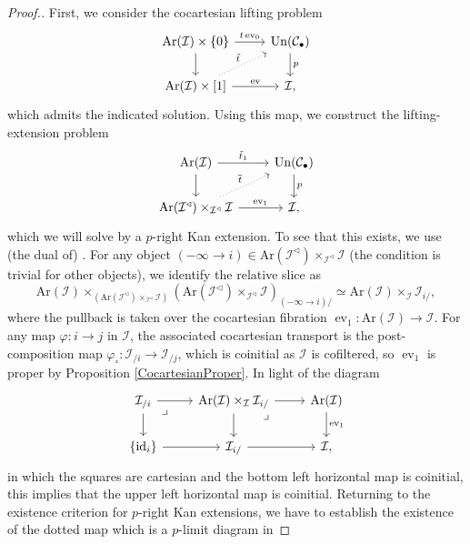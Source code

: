 \documentclass[a4paper,reqno,10pt]{amsart}
\theoremstyle{definition}
\theoremstyle{remark}
\newcommand{\sqb}[1]{\left\lbrack #1\right\rbrack}
\newcommand{\C}{\mathcal{C}}
\newcommand{\I}{\mathcal{I}}
\newcommand{\id}{\operatorname{id}}
\newcommand{\ev}{\operatorname{ev}}
\newcommand{\Un}{\mathrm{Un}}
\newcommand{\Ar}{\mathrm{Ar}}
\begin{document}
\begin{proof}[Proof.]
First, we consider the cocartesian lifting problem
\begin{equation*}
\begin{tikzcd}
\Ar(\I)\times\{0\}\arrow[r,"t\ev_0"]\arrow[d] & \Un(\C_{\bullet})\arrow[d,"p"]\\
\Ar(\I)\times\sqb{1}\arrow[r,"\ev"]\arrow[ur,"\tilde{t}",dotted] & \I,
\end{tikzcd}
\end{equation*}
which admits the indicated solution. Using this map, we construct the lifting-extension problem
\begin{equation*}
\begin{tikzcd}
\Ar(\I)\arrow[r,"\tilde{t}_1"]\arrow[d] & \Un(\C_{\bullet})\arrow[d,"p"]\\
\Ar(\I^{\triangleleft})\times_{\I^{\triangleleft}}\I\arrow[r,"\ev_1"]\arrow[ur,dotted,"\overline{t}"] & \I,
\end{tikzcd}
\end{equation*}
which we will solve by a $p$-right Kan extension. To see that this exists, we use (the dual of) \cite[\href{https://kerodon.net/tag/0302}{Tag 0302}]{kerodon}. For any object $(-\infty\rightarrow i)\in\Ar(\I^{\triangleleft})\times_{\I^{\triangleleft}}\I$ (the condition is trivial for other objects), we identify the relative slice as
\begin{equation*}
\Ar(\I)\times_{(\Ar(\I^{\triangleleft})\times_{\I^{\triangleleft}}\I)}(\Ar(\I^{\triangleleft})\times_{\I^{\triangleleft}}\I)_{(-\infty\rightarrow i)/}\simeq\Ar(\I)\times_{\I}\I_{i/},
\end{equation*}
where the pullback is taken over the cocartesian fibration $\ev_1\colon\Ar(\I)\rightarrow\I$. For any map $\varphi\colon i\rightarrow j$ in $\I$, the associated cocartesian transport is the post-composition map $\varphi_{\circ}\colon\I_{/i}\rightarrow\I_{/j}$, which is coinitial as $\I$ is cofiltered, so $\ev_1$ is proper by Proposition \ref{CocartesianProper}. In light of the diagram
\begin{equation*}
\begin{tikzcd}
\I_{/i}\arrow[r]\arrow[d]\arrow[dr,very near start,phantom,"\lrcorner"] & \Ar(\I)\times_{\I}\I_{i/}\arrow[r]\arrow[d]\arrow[dr,very near start,phantom,"\lrcorner"] & \Ar(\I)\arrow[d,"\ev_1"]\\
\{\id_i\}\arrow[r] & \I_{i/}\arrow[r] & \I,
\end{tikzcd}
\end{equation*}
in which the squares are cartesian and the bottom left horizontal map is coinitial, this implies that the upper left horizontal map is coinitial. Returning to the existence criterion for $p$-right Kan extensions, we have to establish the existence of the dotted map which is a $p$-limit diagram in

\end{proof}
\end{document}
